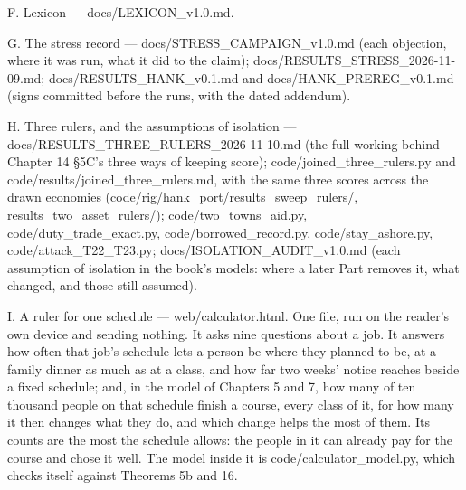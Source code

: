 \begin{receipts}{}
F. Lexicon --- docs/\allowbreak{}LEXICON\_\allowbreak{}v1.\allowbreak{}0.\allowbreak{}md.

G. The stress record --- docs/\allowbreak{}STRESS\_\allowbreak{}CAMPAIGN\_\allowbreak{}v1.\allowbreak{}0.\allowbreak{}md (each objection, where it was run, what it did to the claim); docs/\allowbreak{}RESULTS\_\allowbreak{}STRESS\_\allowbreak{}2026-11-09.\allowbreak{}md; docs/\allowbreak{}RESULTS\_\allowbreak{}HANK\_\allowbreak{}v0.\allowbreak{}1.\allowbreak{}md and docs/\allowbreak{}HANK\_\allowbreak{}PREREG\_\allowbreak{}v0.\allowbreak{}1.\allowbreak{}md (signs committed before the runs, with the dated addendum).

H. Three rulers, and the assumptions of isolation --- docs/\allowbreak{}RESULTS\_\allowbreak{}THREE\_\allowbreak{}RULERS\_\allowbreak{}2026-11-10.\allowbreak{}md (the full working behind Chapter 14 §5C's three ways of keeping score); code/\allowbreak{}joined\_\allowbreak{}three\_\allowbreak{}rulers.\allowbreak{}py and code/\allowbreak{}results/\allowbreak{}joined\_\allowbreak{}three\_\allowbreak{}rulers.\allowbreak{}md, with the same three scores across the drawn economies (code/\allowbreak{}rig/\allowbreak{}hank\_\allowbreak{}port/\allowbreak{}results\_\allowbreak{}sweep\_\allowbreak{}rulers/\allowbreak{}, results\_\allowbreak{}two\_\allowbreak{}asset\_\allowbreak{}rulers/\allowbreak{}); code/\allowbreak{}two\_\allowbreak{}towns\_\allowbreak{}aid.\allowbreak{}py, code/\allowbreak{}duty\_\allowbreak{}trade\_\allowbreak{}exact.\allowbreak{}py, code/\allowbreak{}borrowed\_\allowbreak{}record.\allowbreak{}py, code/\allowbreak{}stay\_\allowbreak{}ashore.\allowbreak{}py, code/\allowbreak{}attack\_\allowbreak{}T22\_\allowbreak{}T23.\allowbreak{}py; docs/\allowbreak{}ISOLATION\_\allowbreak{}AUDIT\_\allowbreak{}v1.\allowbreak{}0.\allowbreak{}md (each assumption of isolation in the book's models: where a later Part removes it, what changed, and those still assumed).

I. A ruler for one schedule --- web/\allowbreak{}calculator.\allowbreak{}html. One file, run on the reader's own device and sending nothing. It asks nine questions about a job. It answers how often that job's schedule lets a person be where they planned to be, at a family dinner as much as at a class, and how far two weeks' notice reaches beside a fixed schedule; and, in the model of Chapters 5 and 7, how many of ten thousand people on that schedule finish a course, every class of it, for how many it then changes what they do, and which change helps the most of them. Its counts are the most the schedule allows: the people in it can already pay for the course and chose it well. The model inside it is code/\allowbreak{}calculator\_\allowbreak{}model.\allowbreak{}py, which checks itself against Theorems 5b and 16.

\end{receipts}


